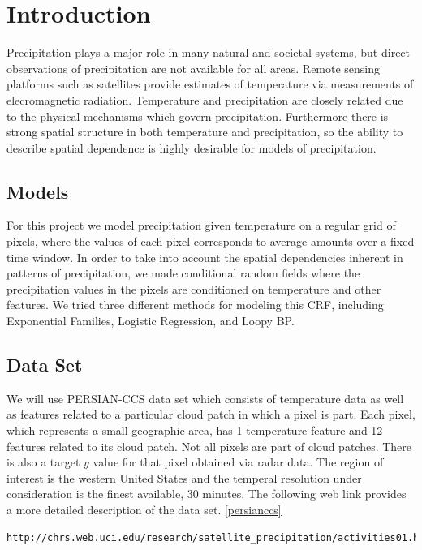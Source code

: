 
\section{Introduction}
Precipitation plays a major role in many natural and societal systems, but direct observations of precipitation are not available for all areas. Remote sensing platforms such as satellites provide estimates of temperature via measurements of elecromagnetic radiation. Temperature and precipitation are closely related due to the physical mechanisms which govern precipitation. Furthermore there is strong spatial structure in both temperature and precipitation, so the ability to describe spatial dependence is highly desirable for models of precipitation. 

\subsection{Models}

For this project we model precipitation given temperature on a regular grid of pixels, where the values of each pixel corresponds to average amounts over a fixed time window. In order to take into account the spatial dependencies inherent in patterns of precipitation, we made conditional random fields where the precipitation values in the pixels are conditioned on temperature and other features. We tried three different methods for modeling this CRF, including Exponential Families, Logistic Regression, and Loopy BP. 

\subsection{Data Set}
We will use PERSIAN-CCS data set which consists of temperature data as well as features related to a particular cloud patch in which a pixel is part. Each pixel, which represents a small geographic area, has 1 temperature feature and 12 features related to its cloud patch. Not all pixels are part of cloud patches. There is also a target $y$ value for that pixel obtained via radar data. The region of interest is the western United States and the temperal resolution under consideration is the finest available, 30 minutes. The following web link provides a more detailed description of the data set. \ref{persianccs}

\begin{lstlisting}
http://chrs.web.uci.edu/research/satellite_precipitation/activities01.html
\end{lstlisting}

